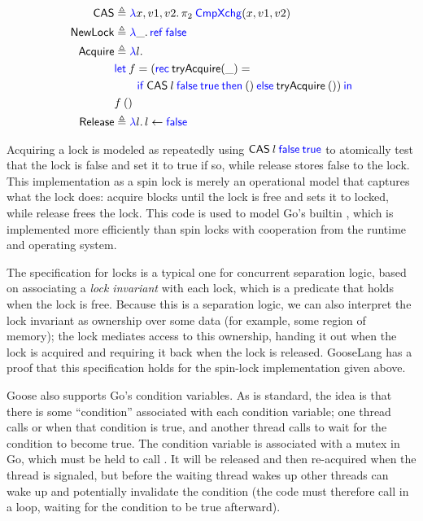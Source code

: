 \begin{align*}
  \CAS &\defeq \gooselambda{x, v1, v2} \pi_{2}\app \goosekw{CmpXchg}(x, v1, v2) \\
  \goosedef{NewLock} & \defeq \gooselambda{\_} \goosekw{ref} \app \goosekw{false} \\
  \Acquire &\defeq \gooselambda{l} \\
       &\goosekw{let}\app f = (\goosekw{rec}\: \textlog{tryAcquire}(\_) = \\
       &\qquad \gooseif{\CAS \app l \app \goosekw{false} \app \goosekw{true}}%
         {()}{\textlog{tryAcquire} \app ()}) \app\goosekw{in} \\
       &f \app () \\
  \goosedef{Release} &\defeq \gooselambda{l} l \gets \goosekw{false} \\
\end{align*}

Acquiring a lock is modeled as repeatedly using
$\mathsf{CAS} \: l \: \mathsf{\textcolor{blue}{false}} \: \mathsf{\textcolor{blue}{true}}$ to
atomically test that the lock is false and set it to true if so, while release
stores false to the lock. This implementation as a spin lock is merely an
operational model that captures what the lock does: acquire blocks until the
lock is free and sets it to locked, while release frees the lock. This code is
used to model Go's builtin , which is implemented more
efficiently than spin locks with cooperation from the runtime and operating
system.

The specification for locks is a typical one for concurrent separation logic,
based on associating a \emph{lock invariant} with each lock, which is a predicate that holds when the lock
is free. Because this is a separation logic, we can also interpret the lock
invariant as ownership over some data (for example, some region of memory); the
lock mediates access to this ownership, handing it out when the lock is acquired
and requiring it back when the lock is released. GooseLang has a proof that this
specification holds for the spin-lock implementation given above.

Goose also supports Go's condition variables. As is standard, the idea is that
there is some ``condition'' associated with each condition variable; one thread
calls  or  when that condition is true, and another
thread calls  to wait for the condition to become true. The condition
variable is associated with a mutex in Go, which must be held to call
. It will be released and then re-acquired when the thread is
signaled, but before the waiting thread wakes up other threads can wake up and
potentially invalidate the condition (the code must therefore call 
in a loop, waiting for the condition to be true afterward).

